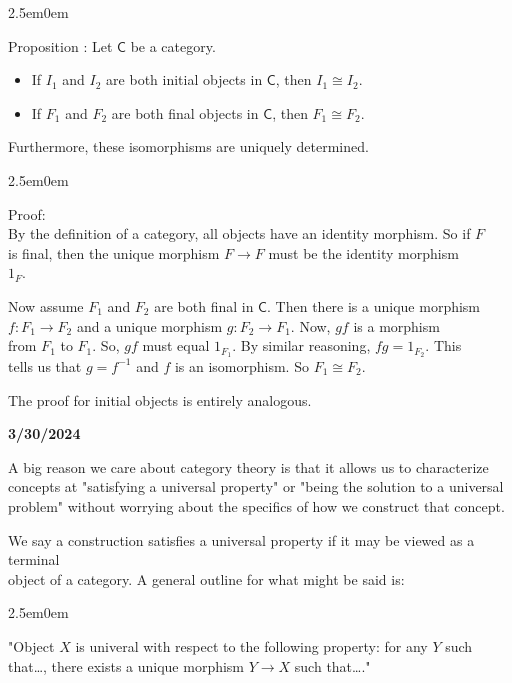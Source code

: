 \documentclass{book}
\newcommand{\hTwo}{%
   \color{MidnightBlue}%
   \fontsize{13}{15}\selectfont%
}
\newcommand{\hThree}{%
   \color{PineGreen!85!Orange}
   \fontsize{13}{15}\selectfont%
}
\newenvironment{myIndent}{%
   \begin{adjustwidth}{2.5em}{0em}%
}{%
   \end{adjustwidth}%
}
\newcommand*{\markDate}[1]{%
   {\huge \color{Black} \textbf{#1} \newline}%
}
\newcommand{\mcateg}[1]{{\bm{\mathsf{#1}}}}
\newcounter{PropNumber}
\newcommand{\propCount}{%
   \stepcounter{PropNumber}%
   \thePropNumber%
}
\newcommand{\retTwo}{\hfill\bigbreak}
\begin{document}
{\begin{myIndent} \hTwo
   Proposition \propCount: Let $\mcateg{C}$ be a category.
   \begin{itemize}
      \item If $I_1$ and $I_2$ are both initial objects in $\mcateg{C}$, then $I_1 \cong I_2$.
      \item If $F_1$ and $F_2$ are both final objects in $\mcateg{C}$, then $F_1 \cong F_2$.
   \end{itemize}
   Furthermore, these isomorphisms are uniquely determined.

   {\begin{myIndent} \hThree
      Proof:\\
      By the definition of a category, all objects have an identity morphism. So if $F$\\ is final, then the unique morphism $F \longrightarrow F$ must be the identity morphism\\ $1_F$.\retTwo

      Now assume $F_1$ and $F_2$ are both final in $\mcateg{C}$. Then there is a unique morphism\\ $f: F_1 \longrightarrow F_2$ and a unique morphism $g: F_2 \longrightarrow F_1$. Now, $gf$ is a morphism\\ from $F_1$ to $F_1$. So, $gf$ must equal $1_{F_1}$. By similar reasoning, $fg = 1_{F_2}$. This\\ tells us that $g = f^{-1}$ and $f$ is an isomorphism. So $F_1 \cong F_2$.

      \newpage

      The proof for initial objects is entirely analogous. \retTwo
   \end{myIndent}}
\end{myIndent}}

\markDate{3/30/2024}

A big reason we care about category theory is that it allows us to characterize\\ concepts at "satisfying a universal property" or "being the solution to a universal\\ problem" without worrying about the specifics of how we construct that concept.\retTwo

We say a construction satisfies a universal property if it may be viewed as a terminal\\ object of a category. A general outline for what might be said is:
{\begin{myIndent}\hTwo
   "Object $X$ is univeral with respect to the following property: for any $Y$ such that\dots, there exists a unique morphism $Y \rightarrow X$ such that\dots."\retTwo
\end{myIndent}}
\end{document}
